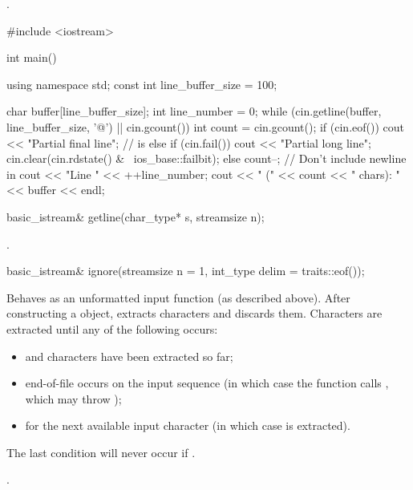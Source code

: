 \begin{itemdescr}
\pnum
\returns
{}.

\pnum
\begin{example}
\begin{codeblock}
#include <iostream>

int main() {
  using namespace std;
  const int line_buffer_size = 100;

  char buffer[line_buffer_size];
  int line_number = 0;
  while (cin.getline(buffer, line_buffer_size, '@\textbackslash@n') || cin.gcount()) {
    int count = cin.gcount();
    if (cin.eof())
      cout << "Partial final line";     //  is 
    else if (cin.fail()) {
      cout << "Partial long line";
      cin.clear(cin.rdstate() & ~ios_base::failbit);
    } else {
      count--;                          // Don't include newline in 
      cout << "Line " << ++line_number;
    }
    cout << " (" << count << " chars): " << buffer << endl;
  }
}
\end{codeblock}
\end{example}
\end{itemdescr}

%
\begin{itemdecl}
basic_istream& getline(char_type* s, streamsize n);
\end{itemdecl}

\begin{itemdescr}
\pnum
\returns
{}.
\end{itemdescr}

%
\begin{itemdecl}
basic_istream& ignore(streamsize n = 1, int_type delim = traits::eof());
\end{itemdecl}

\begin{itemdescr}
\pnum
\effects
Behaves as an unformatted input function
(as described above).
After constructing a  object, extracts
characters and discards them.
Characters are extracted until any of the following occurs:
\begin{itemize}
\item
{}
and
 characters have been extracted so far;
\item
end-of-file occurs on the input sequence
(in which case the function calls
,
which may throw
);
\item
{}
for the next available input character 
(in which case  is extracted).
\end{itemize}
\begin{note}
The last condition will never occur if
.
\end{note}

\pnum
\returns
{}.
\end{itemdescr}


